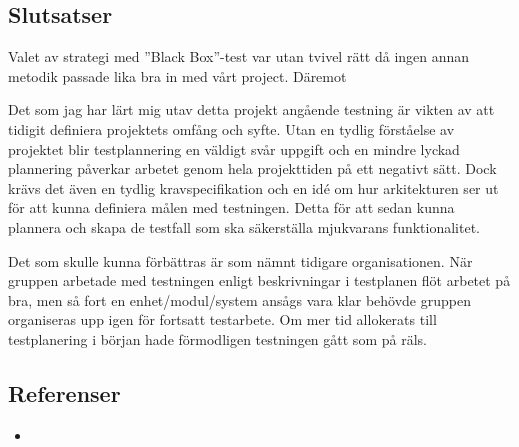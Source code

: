 	\subsection{Slutsatser}
	Valet av strategi med ''Black Box''-test var utan tvivel rätt då ingen annan metodik passade lika bra in med vårt project. Däremot
	
	Det som jag har lärt mig utav detta projekt angående testning är vikten av att tidigit definiera projektets omfång och syfte. Utan en tydlig förståelse av projektet blir testplannering en väldigt svår uppgift och en mindre lyckad plannering påverkar arbetet genom hela projekttiden på ett negativt sätt. Dock krävs det även en tydlig kravspecifikation och en idé om hur arkitekturen ser ut för att kunna definiera målen med testningen. Detta för att sedan kunna plannera och skapa de testfall som ska säkerställa mjukvarans funktionalitet.
	
	Det som skulle kunna förbättras är som nämnt tidigare organisationen. När gruppen arbetade med testningen enligt beskrivningar i testplanen flöt arbetet på bra, men så fort en enhet/modul/system ansågs vara klar behövde gruppen organiseras upp igen för fortsatt testarbete. Om mer tid allokerats till testplanering i början hade förmodligen testningen gått som på räls.
	
	\subsection{Referenser}
	\begin{itemize}
	\item{}
	\end{itemize}
	
	